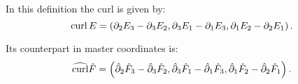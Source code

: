 \noindent In this definition the curl is given by:
%
\begin{equation}
    \operatorname{curl} E=\left(\partial_2 E_3-\partial_3 E_2,\partial_3 E_1-\partial_1 E_3,\partial_1 E_2-\partial_2 E_1\right).
\end{equation}

\noindent Its counterpart in master coordinates is:
%
\begin{equation}
    \widehat{\operatorname{curl}} \hat{F}=\left(\hat{\partial}_2 \hat{F}_3-\hat{\partial}_3 \hat{F}_2,\hat{\partial}_3 \hat{F}_1-\hat{\partial}_1 \hat{F}_3,\hat{\partial}_1 \hat{F}_2-\hat{\partial}_2 \hat{F}_1\right).
\end{equation}


